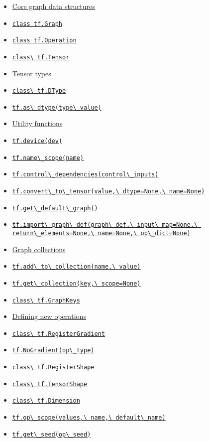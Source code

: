 \begin{itemize}
\tightlist
\item \hyperref[core-graph-data-structures]{Core graph data structures}
\item \hyperref[class-tf.graph]{\lstinline{class tf.Graph}}
\item \protect\hyperlink{Operation}{\lstinline{class tf.Operation}}
\item \protect\hyperlink{Tensor}{\lstinline{class\ tf.Tensor}}
\item \protect\hyperlink{AUTOGENERATED-tensor-types}{Tensor types}
\item \protect\hyperlink{DType}{\lstinline{class\ tf.DType}}
\item \protect\hyperlink{asux5fdtype}{\lstinline{tf.as\_dtype(type\_value)}}
\item \protect\hyperlink{AUTOGENERATED-utility-functions}{Utility functions}
\item \protect\hyperlink{device}{\lstinline{tf.device(dev)}}
\item \protect\hyperlink{nameux5fscope}{\lstinline{tf.name\_scope(name)}}
\item \protect\hyperlink{controlux5fdependencies}{\lstinline{tf.control\_dependencies(control\_inputs)}}
\item \protect\hyperlink{convertux5ftoux5ftensor}{\lstinline{tf.convert\_to\_tensor(value,\ dtype=None,\ name=None)}}
\item \protect\hyperlink{getux5fdefaultux5fgraph}{\lstinline{tf.get\_default\_graph()}}
\item \protect\hyperlink{importux5fgraphux5fdef}{\lstinline{tf.import\_graph\_def(graph\_def,\ input\_map=None,\ return\_elements=None,\ name=None,\ op\_dict=None)}}
\item \protect\hyperlink{AUTOGENERATED-graph-collections}{Graph collections}
\item \protect\hyperlink{addux5ftoux5fcollection}{\lstinline{tf.add\_to\_collection(name,\ value)}}
\item \protect\hyperlink{getux5fcollection}{\lstinline{tf.get\_collection(key,\ scope=None)}}
\item \protect\hyperlink{GraphKeys}{\lstinline{class\ tf.GraphKeys}}
\item \protect\hyperlink{AUTOGENERATED-defining-new-operations}{Defining new
  operations}
\item \protect\hyperlink{RegisterGradient}{\lstinline{class\ tf.RegisterGradient}}
\item \protect\hyperlink{NoGradient}{\lstinline{tf.NoGradient(op\_type)}}
\item \protect\hyperlink{RegisterShape}{\lstinline{class\ tf.RegisterShape}}
\item \protect\hyperlink{TensorShape}{\lstinline{class\ tf.TensorShape}}
\item \protect\hyperlink{Dimension}{\lstinline{class\ tf.Dimension}}
\item \protect\hyperlink{opux5fscope}{\lstinline{tf.op\_scope(values,\ name,\ default\_name)}}
\item \protect\hyperlink{getux5fseed}{\lstinline{tf.get\_seed(op\_seed)}}
\end{itemize}

